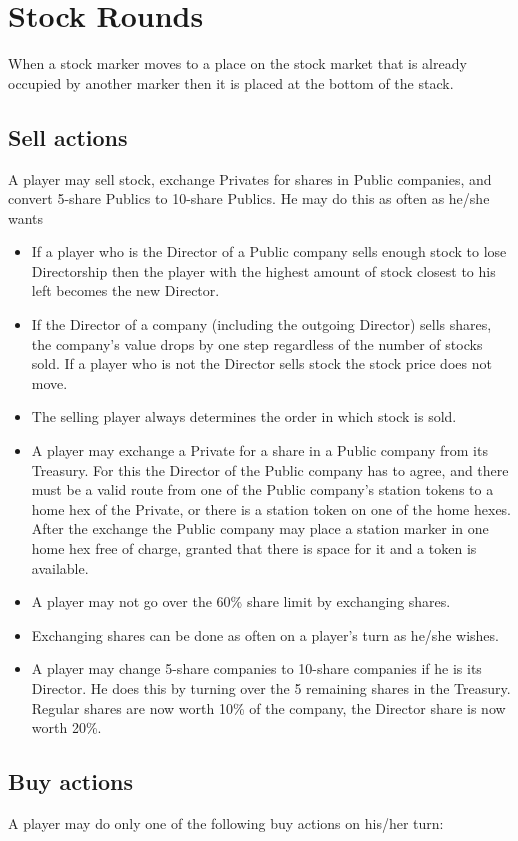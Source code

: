\documentclass[a4paper,twocolumn]{article}
\begin{document}
\section{Stock Rounds}
When a stock marker moves to a place on the stock market that is already
occupied by another marker then it is placed at the bottom of the stack.
\subsection{Sell actions}
A player may sell stock, exchange Privates for shares in Public companies, and
convert 5-share Publics to 10-share Publics. He may do this as often as he/she
wants
\begin{itemize}
	\item If a player who is the Director of a Public company sells enough stock
	to lose Directorship then the player with the highest amount of stock
	closest to his left becomes the new Director.
	\item If the Director of a company (including the outgoing Director) sells
	shares, the company's value drops by one step regardless of the number of
	stocks sold. If a player who is not the Director sells stock the stock price
	does not move.
	\item The selling player always determines the order in which stock is sold.
	\item A player may exchange a Private for a share in a Public company from
	its Treasury. For this the Director of the Public company has to agree, and
	there must be a valid route from one of the Public company's station tokens
	to a home hex of the Private, or there is a station token on one of the home
	hexes. After the exchange the Public company may place a station marker in
	one home hex free of charge, granted that there is space for it and a token
	is available.
	\item A player may not go over the 60\% share limit by exchanging shares.
	\item Exchanging shares can be done as often on a player's turn as he/she
	wishes.
	\item A player may change 5-share companies to 10-share companies if he is
	its Director. He does this by turning over the 5 remaining shares in the
	Treasury. Regular shares are now worth 10\% of the company, the Director
	share is now worth 20\%.
\end{itemize}

\subsection{Buy actions}
A player may do only one of the following buy actions on his/her turn:
\end{document}
